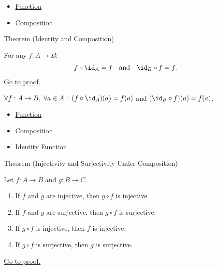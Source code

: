 \begin{dependencies}
\begin{itemize}
  \item \hyperref[def:function]{Function}
  \item \hyperref[def:composition]{Composition}
\end{itemize}
\end{dependencies}

\begin{theorembox}{Theorem (Identity and Composition)}
\begin{theorem}\label{thm:comp-id}
For any $f : A \to B$:
\[
f \circ \id_A = f
\quad\text{and}\quad
\id_B \circ f = f.
\]
\hyperref[prf:comp-id]{Go to proof.}
\end{theorem}
\end{theorembox}

\begin{remark*}
$\forall f : A \to B,\; \forall a \in A:\; (f \circ \id_A)(a) = f(a)$ and $(\id_B \circ f)(a) = f(a)$.
\end{remark*}

\begin{dependencies}
\begin{itemize}
  \item \hyperref[def:function]{Function}
  \item \hyperref[def:composition]{Composition}
  \item \hyperref[def:identity]{Identity Function}
\end{itemize}
\end{dependencies}

\begin{theorembox}{Theorem (Injectivity and Surjectivity Under Composition)}
\begin{theorem}\label{thm:comp-inj-surj}
Let $f : A \to B$ and $g : B \to C$.
\begin{enumerate}[label=(\roman*)]
\item If $f$ and $g$ are injective, then $g \circ f$ is injective.
\item If $f$ and $g$ are surjective, then $g \circ f$ is surjective.
\item If $g \circ f$ is injective, then $f$ is injective.
\item If $g \circ f$ is surjective, then $g$ is surjective.
\end{enumerate}
\hyperref[prf:comp-inj-surj]{Go to proof.}
\end{theorem}
\end{theorembox}

